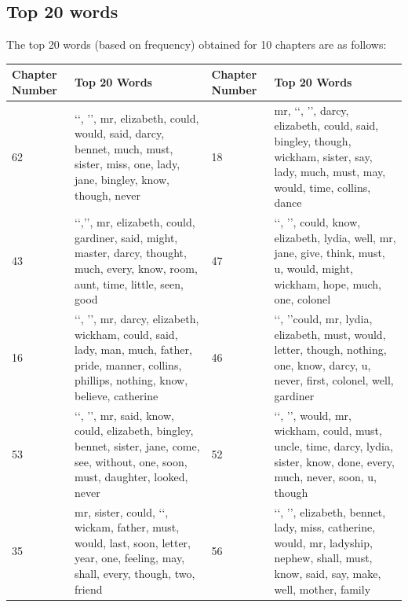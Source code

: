 \documentclass{article}
\begin{document}
\subsection{Top 20 words}
\begin{flushleft}
	The top 20 words (based on frequency) obtained for 10 chapters are as follows:
	\begin{center}
		\begin{tabular}{|p{}|p{}||p{}|p{}|}
			\hline
			Chapter Number & Top 20 Words & Chapter Number & Top 20 Words \\
			\hline
			\hline
			62 & \lq\lq, \rq\rq, mr, elizabeth, could, would, said, darcy, bennet, much, must, sister, miss, one, lady, jane, bingley, know, though, never &
			18 & mr, \lq\lq, \rq\rq, darcy, elizabeth, could, said, bingley, though, wickham, sister, say, lady, much, must, may, would, time, collins, dance\\
			\hline
			43 & \lq\lq,\rq\rq, mr, elizabeth, could, gardiner, said, might, master, darcy, thought, much, every, know, room, aunt, time, little, seen, good & 
			47 &  \lq\lq, \rq\rq, could, know, elizabeth, lydia, well, mr, jane, give, think, must, u, would, might, wickham, hope, much, one, colonel  \\
			\hline
			16 & \lq\lq, \rq\rq, mr, darcy, elizabeth, wickham, could, said, lady, man, much, father, pride, manner, collins, phillips, nothing, know, believe, catherine &
			46 & \lq\lq, \rq\rq could, mr, lydia, elizabeth, must, would, letter, though, nothing, one, know, darcy, u, never, first, colonel, well, gardiner\\
			\hline
			53 & \lq\lq, \rq\rq, mr, said, know, could, elizabeth, bingley, bennet, sister, jane, come, see, without, one, soon, must, daughter, looked, never &
			52 & \lq\lq, \rq\rq, would, mr, wickham, could, must, uncle, time, darcy, lydia, sister, know, done, every, much, never, soon, u, though  \\
			\hline
			35 & mr, sister, could, \lq\lq, wickam, father, must, would, last, soon, letter, year, one, feeling, may, shall, every, though, two, friend   &
			56 & \lq\lq, \rq\rq, elizabeth, bennet, lady, miss, catherine, would, mr, ladyship, nephew, shall, must, know, said, say, make, well, mother, family \\
			\hline
		\end{tabular}
	\end{center}
\end{flushleft}
\newpage
\end{document}
